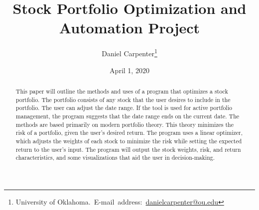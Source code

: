 \documentclass[12pt,english]{article}
\begin{document}
    
    \begin{singlespace}
    \title{Stock Portfolio Optimization and Automation Project}
    \end{singlespace}
    
    \author{Daniel Carpenter\thanks{University of Oklahoma.\
    E-mail~address:~\href{mailto:danielcarpenter@ou.edu}{danielcarpenter@ou.edu}}}

    \date{April 1, 2020}
    \maketitle
    \begin{abstract}
    \begin{doublespace}
    	This paper will outline the methods and uses of a program that optimizes a stock portfolio. The portfolio consists of any stock that the user desires to include in the portfolio. The user can adjust the date range. If the tool is used for active portfolio management, the program suggests that the date range ends on the current date. The methods are based primarily on modern portfolio theory. This theory minimizes the risk of a portfolio, given the user’s desired return. The program uses a linear optimizer, which adjusts the weights of each stock to minimize the risk while setting the expected return to the user’s input. The program will output the stock weights, risk, and return characteristics, and some visualizations that aid the user in decision-making.
    
    \end{doublespace}
    \end{abstract}
    \vfill{}
    
    \pagebreak{}
    
\end{document}
